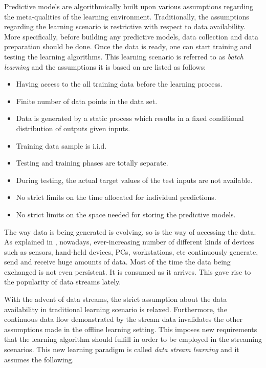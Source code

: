 {Predictive models are algorithmically built upon various assumptions regarding the meta-qualities of the learning environment. Traditionally, the assumptions regarding the learning scenario is restrictive with respect to data availability. More specifically, before building any predictive models, data collection and data preparation should be done. Once the data is ready, one can start training and testing the learning algorithms. This learning scenario is referred to as {\it batch learning} and the assumptions it is based on are listed as follows:

\begin{itemize}
\item Having access to the all training data before the learning process.
\item Finite number of data points in the data set.
\item Data is generated by a static process which results in a fixed conditional distribution of outputs given inputs.
\item Training data sample is i.i.d.
\item Testing and training phases are totally separate.
\item During testing, the actual target values of the test inputs are not available.
\item No strict limits on the time allocated for individual predictions.
\item No strict limits on the space needed for storing the predictive models.
\end{itemize}

The way data is being generated is evolving, so is the way of accessing the data. As explained in \cite[p. 324]{gama_issues_2009}, nowadays, ever-increasing number of different kinds of devices such as sensors, hand-held devices, PCs, workstations, etc continuously generate, send and receive huge amounts of data. Most of the time the data being exchanged is not even persistent. It is consumed as it arrives. This gave rise to the popularity of data streams lately.

With the advent of data streams, the strict assumption about the data availability in traditional learning scenario is relaxed. Furthermore, the continuous data flow demonstrated by the stream data invalidates the other assumptions made in the offline learning setting. This imposes new requirements that the learning algorithm should fulfill in order to be employed in the streaming scenarios. This new learning paradigm is called {\it data stream learning} and it assumes the following.

}
